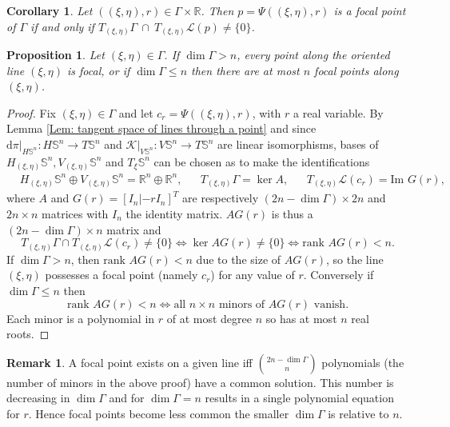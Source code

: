 \documentclass[12pt]{amsart}
\theoremstyle{plain}
\newtheorem{Cor}{Corollary}
\newtheorem{Prop}{Proposition}
\theoremstyle{definition}
\newtheorem{Rem}{Remark}
\def\S{\mathbb{S}}
\newcommand{\td}{\mathrm{d}}
\numberwithin{equation}{section}
\begin{document}
\begin{Cor}
   Let $(
    (\xi,\eta),r)\in \Gamma \times \mathbb{R}$. Then $p=\Psi((\xi,\eta),r)$ is a focal point of $\Gamma$ if and only if $T_{(\xi,\eta)}\Gamma~\cap~T_{(\xi,\eta)}\mathcal{L}(p)\neq \{0\}$.
\end{Cor}
\begin{Prop}
    Let $(\xi,\eta)\in \Gamma$. If $\dim \Gamma > n$, every point along the oriented line $(\xi,\eta)$ is focal, or if $\dim \Gamma \leq n$ then there are at most $n$ focal points along $(\xi,\eta)$.
\end{Prop}
\begin{proof}
    Fix $(\xi,\eta)\in\Gamma$ and let $c_r=\Psi((\xi,\eta),r)$, with $r$ a real variable. By Lemma \ref{Lem: tangent space of lines through a point} and since $\td\pi|_{H\S^n}:H\S^n\to T\S^n$ and $\mathcal{K}|_{V\S^n}:V\S^n\to T\S^n$ are linear isomorphisms, bases of $H_{(\xi,\eta)}\mathbb{S}^n,V_{(\xi,\eta)}\mathbb{S}^n$ and $T_\xi \S^n$ can be chosen as to make the identifications
    \begin{align*}
        & H_{(\xi,\eta)}\mathbb{S}^n \oplus V_{(\xi,\eta)}\mathbb{S}^n = \mathbb{R}^{n}\oplus\mathbb{R}^{n}, 
        &&T_{(\xi,\eta)}\Gamma = \ker A, &&T_{(\xi,\eta)}\mathcal{L}(c_r) = \mbox{Im }G(r),
    \end{align*}
    where $A$ and $G(r)=[I_n | -r I_n]^T$ are respectively $(2n-\dim \Gamma) \times 2n$ and $2n\times n$ matrices with $I_n$ the identity matrix. $AG(r)$ is thus a  $(2n-\dim \Gamma) \times n$ matrix and
    \[
    T_{(\xi,\eta)}\Gamma \cap T_{(\xi,\eta)}\mathcal{L}(c_r) \neq \{0\} \iff \ker AG(r) \neq \{0\} \iff \mbox{rank }AG(r) < n.
    \]
    If $\dim  \Gamma >n$, then $\mbox{rank }AG(r)<n$ due to the size of $AG(r)$, so the line ${(\xi,\eta)}$ possesses a focal point (namely $c_r$) for any value of $r$. Conversely if $\dim \Gamma \leq n$ then 
    \[
    \mbox{rank }AG(r) < n \iff \text{all } n \times n \text{ minors of } AG(r) \text{ vanish.}
    \]
    Each minor is a polynomial in $r$ of at most degree $n$ so has at most $n$ real roots.
\end{proof}
\begin{Rem}
    A focal point exists on a given line iff
    $\binom{2n-{\dim \Gamma}}{n}$ 
     polynomials (the number of minors in the above proof) have a common solution. This number is decreasing in $\dim \Gamma$ and for $\dim \Gamma=n$ results in a single polynomial equation for $r$. Hence focal points become less common the smaller $\dim \Gamma$ is relative to $n$.
\end{Rem}
\end{document}
